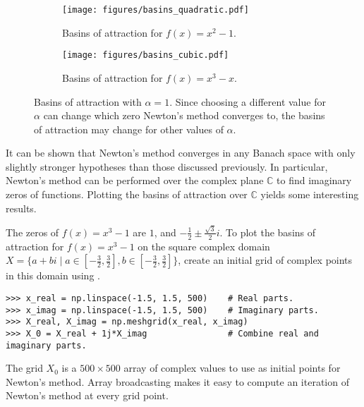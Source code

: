 \begin{figure}[H] %
\centering
\begin{subfigure}{.48\textwidth}
    \centering
    \texttt{[image: figures/basins\_quadratic.pdf]}
    \caption{Basins of attraction for $f(x) = x^2 -1$.}
    \label{fig:basins-quadratic}
\end{subfigure}
\quad
\begin{subfigure}{.48\textwidth}
    \centering
    \texttt{[image: figures/basins\_cubic.pdf]}
    \caption{Basins of attraction for $f(x) = x^3 -x$.}
    \label{fig:basins-cubic}
\end{subfigure}
\caption{Basins of attraction with $\alpha=1$.
Since choosing a different value for $\alpha$ can change which zero Newton's method converges to, the basins of attraction may change for other values of $\alpha$.}
\end{figure}

It can be shown that Newton's method converges in any Banach space with only slightly stronger hypotheses than those discussed previously. %
In particular, Newton's method can be performed over the complex plane $\mathbb{C}$ to find imaginary zeros of functions.
Plotting the basins of attraction over $\mathbb{C}$ yields some interesting results.

The zeros of $f(x) = x^3 - 1$ are $1$, and $-\frac{1}{2} \pm \frac{\sqrt{3}}{2}i$.
To plot the basins of attraction for $f(x) = x^3-1$ on the square complex domain $X = \{a+bi \mid a \in [-\frac{3}{2},\frac{3}{2}], b \in [-\frac{3}{2},\frac{3}{2}]\}$,
create an initial grid of complex points in this domain using .

\begin{lstlisting}
>>> x_real = np.linspace(-1.5, 1.5, 500)    # Real parts.
>>> x_imag = np.linspace(-1.5, 1.5, 500)    # Imaginary parts.
>>> X_real, X_imag = np.meshgrid(x_real, x_imag)
>>> X_0 = X_real + 1j*X_imag                # Combine real and imaginary parts.
\end{lstlisting}

The grid $X_0$ is a $500\times500$ array of complex values to use as initial points for Newton's method.
Array broadcasting makes it easy to compute an iteration of Newton's method at every grid point.

